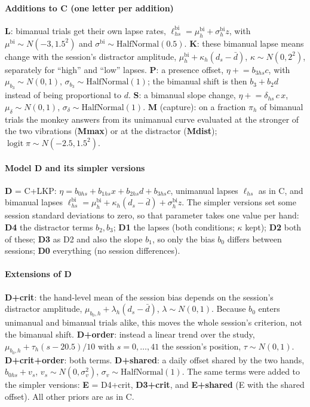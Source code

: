 \paragraph{Additions to C (one letter per addition)}
\textbf{L}: bimanual trials get their own lapse rates, $\ell^{\mathrm{bi}}_{hs}=\mu^{\mathrm{bi}}_h+\sigma^{\mathrm{bi}}_h z$, with $\mu^{\mathrm{bi}}\sim N(-3,1.5^2)$ and $\sigma^{\mathrm{bi}}\sim\mathrm{HalfNormal}(0.5)$.
\textbf{K}: these bimanual lapse means change with the session's distractor amplitude, $\mu^{\mathrm{bi}}_h+\kappa_h(d_s-\bar d)$, $\kappa\sim N(0,2^2)$, separately for ``high'' and ``low'' lapses.
\textbf{P}: a presence offset, $\eta \mathrel{+}= b_{3hs}c$, with $\mu_{b_3}\sim N(0,1)$, $\sigma_{b_3}\sim\mathrm{HalfNormal}(1)$; the bimanual shift is then $b_3+b_2 d$ instead of being proportional to $d$.
\textbf{S}: a bimanual slope change, $\eta \mathrel{+}= \delta_{hs}\,c\,x$, $\mu_\delta\sim N(0,1)$, $\sigma_\delta\sim\mathrm{HalfNormal}(1)$.
\textbf{M} (capture): on a fraction $\pi_h$ of bimanual trials the monkey answers from its unimanual curve evaluated at the stronger of the two vibrations (\textbf{Mmax}) or at the distractor (\textbf{Mdist}); $\operatorname{logit}\pi\sim N(-2.5,1.5^2)$.

\paragraph{Model D and its simpler versions}
\textbf{D} = C+LKP: $\eta=b_{0hs}+b_{1hs}x+b_{2hs}d+b_{3hs}c$, unimanual lapses $\ell_{hs}$ as in C, and bimanual lapses
$\ell^{\mathrm{bi}}_{hs}=\mu^{\mathrm{bi}}_h+\kappa_h(d_s-\bar d)+\sigma^{\mathrm{bi}}_h z$.
The simpler versions set some session standard deviations to zero, so that parameter takes one value per hand:
\textbf{D4} the distractor terms $b_2,b_3$; \textbf{D1} the lapses (both conditions; $\kappa$ kept); \textbf{D2} both of these;
\textbf{D3} as D2 and also the slope $b_1$, so only the bias $b_0$ differs between sessions; \textbf{D0} everything (no session differences).

\paragraph{Extensions of D}
\textbf{D+crit}: the hand-level mean of the session bias depends on the session's distractor amplitude, $\mu_{b_0,h}+\lambda_h(d_s-\bar d)$, $\lambda\sim N(0,1)$.
Because $b_0$ enters unimanual and bimanual trials alike, this moves the whole session's criterion, not the bimanual shift.
\textbf{D+order}: instead a linear trend over the study, $\mu_{b_0,h}+\tau_h(s-20.5)/10$ with $s=0,\dots,41$ the session's position, $\tau\sim N(0,1)$.
\textbf{D+crit+order}: both terms.
\textbf{D+shared}: a daily offset shared by the two hands, $b_{0hs}+v_s$, $v_s\sim N(0,\sigma_v^2)$, $\sigma_v\sim\mathrm{HalfNormal}(1)$.
The same terms were added to the simpler versions: \textbf{E} = D4+crit, \textbf{D3+crit}, and \textbf{E+shared} (E with the shared offset).
All other priors are as in C.
